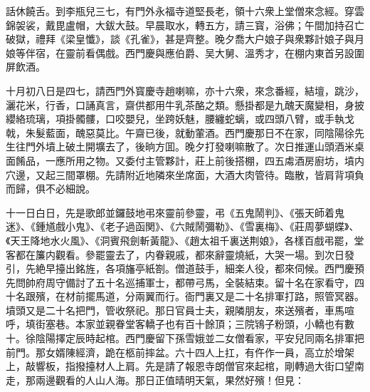 話休饒舌。到李瓶兒三七，有門外永福寺道堅長老，領十六衆上堂僧來念經。穿雲錦袈裟，戴毘盧帽，大鈸大鼓。早晨取水，轉五方，請三寳，浴佛；午間加持召亡破獄，禮拜《梁皇懺》，談《孔雀》，甚是齊整。晚夕喬大户娘子與衆夥計娘子與月娘等伴宿，在靈前看偶戲。西門慶與應伯爵、吴大舅、溫秀才，在棚内東首另設圍屏飲酒。

十月初八日是四七，請西門外寳慶寺趙喇嘛，亦十六衆，來念番經，結壇，跳沙，灑花米，行香，口誦真言，齋供都用牛乳茶酪之類。懸掛都是九醜天魔變相，身披纓絡琉璃，項掛髑髏，口咬嬰兒，坐跨妖魅，腰纏蛇螭，或四頭八臂，或手執戈戟，朱髮藍面，醜惡莫比。午齋已後，就動葷酒。西門慶那日不在家，同陰陽徐先生往門外墳上破土開壙去了，後晌方囬。晚夕打發喇嘛散了。次日推運山頭酒米桌面餚品，一應所用之物。又委付主管夥計，莊上前後搭棚，四五䖏酒房廚坊，墳内穴邊，又起三間罩棚。先請附近地隣來坐席面，大酒大肉管待。臨散，皆肩背項負而歸，俱不必細說。

十一日白日，先是歌郎並鑼鼓地弔來靈前參靈，弔《五鬼鬧判》、《張天師着鬼迷》、《鍾馗戲小鬼》、《老子過函関》、《六賊鬧彌勒》、《雪裏梅》、《莊周夢蝴蝶》、《天王降地水火風》、《洞賓飛劍斬黃龍》、《趙太祖千裏送荆娘》，各樣百戲弔罷，堂客都在簾内觀看。參罷靈去了，内眷親戚，都來辭靈燒紙，大哭一場。到次日發引，先絶早擡出銘旌，各項旛亭紙劄。僧道鼓手，細楽人役，都來伺候。西門慶預先問帥府周守備討了五十名巡捕軍士，都帶弓馬，全裝結束。留十名在家看守，四十名跟殯，在材前擺馬道，分兩翼而行。衙門裏又是二十名排軍打路，照管冥器。墳頭又是二十名把門，管收祭祀。那日官員士夫，親隣朋友，來送殯者，車馬喧呼，填街塞巷。本家並親眷堂客轎子也有百十餘頂；三院鴇子粉頭，小轎也有數十。徐陰陽擇定辰時起棺。西門慶留下孫雪娥並二女僧看家，平安兒同兩名排軍把前門。那女婿陳經濟，跪在柩前摔盆。六十四人上扛，有仵作一員，高立於增架上，敲響板，指撥擡材人上肩。先是請了報恩寺朗僧官來起棺，剛轉過大街口望南走，那兩邊觀看的人山人海。那日正值晴明天氣，果然好殯！但見：

